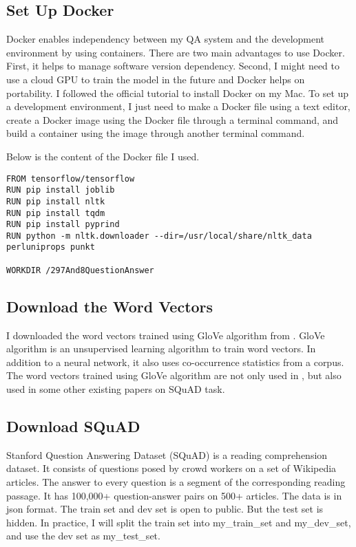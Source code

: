 \documentclass[12pt]{article}
\begin{document}
\subsection{Set Up Docker}

Docker enables independency between my QA system and the development environment by using containers. There are two main advantages to use Docker. First, it helps to manage software version dependency. Second, I might need to use a cloud GPU to train the model in the future and Docker helps on portability. I followed the official tutorial to install Docker on my Mac. To set up a development environment, I just need to make a Docker file using a text editor, create a Docker image using the Docker file through a terminal command, and build a container using the image through another terminal command.

Below is the content of the Docker file I used.

\begin{verbatim}
FROM tensorflow/tensorflow
RUN pip install joblib
RUN pip install nltk
RUN pip install tqdm
RUN pip install pyprind
RUN python -m nltk.downloader --dir=/usr/local/share/nltk_data perluniprops punkt

WORKDIR /297And8QuestionAnswer
\end{verbatim}

\subsection{Download the Word Vectors}

I downloaded the word vectors trained using GloVe algorithm\cite{pennington2014glove} from \cite{glove}. GloVe algorithm is an unsupervised learning algorithm to train word vectors. In addition to a neural network, it also uses co-occurrence statistics from a corpus. The word vectors trained using GloVe algorithm are not only used in \cite{wang2016machine}, but also used in some other existing papers on SQuAD task.

\subsection{Download SQuAD}

Stanford Question Answering Dataset (SQuAD) is a reading comprehension dataset. It consists of questions posed by crowd workers on a set of Wikipedia articles. The answer to every question is a segment of the corresponding reading passage. It has 100,000+ question-answer pairs on 500+ articles. The data is in json format. The train set and dev set is open to public. But the test set is hidden. In practice, I will split the train set into my\_train\_set and my\_dev\_set, and use the dev set as my\_test\_set.
\end{document}
